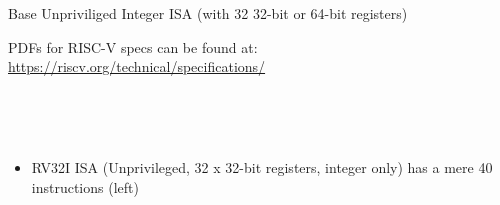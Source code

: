 \documentclass{article}
\newcommand{\hm}{\hspace*{1em}}
\newcommand{\hmm}{\hspace*{2em}}
\begin{document}

\begin{center}
{\Huge
  Base Unpriviliged Integer ISA (with 32 32-bit or 64-bit registers)}

\vspace*{1ex}

PDFs for RISC-V specs can be found at: \url{https://riscv.org/technical/specifications/}

\vspace*{1ex}

\vfill

\begin{minipage}[t]{5in}
  \hmm \\
\end{minipage}
\hm
\begin{minipage}[t]{5in}
  \hmm \\
  \begin{itemize}\large

  \item RV32I ISA (Unprivileged, 32 x 32-bit registers, integer only)
    has a mere 40 instructions (left)


\end{itemize}
\end{minipage}
\end{center}
\end{document}
